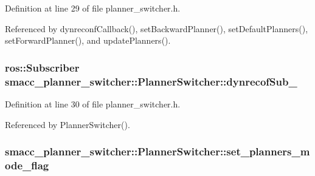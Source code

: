 Definition at line 29 of file planner\+\_\+switcher.\+h.



Referenced by dynreconf\+Callback(), set\+Backward\+Planner(), set\+Default\+Planners(), set\+Forward\+Planner(), and update\+Planners().

\subsubsection[{\texorpdfstring{dynrecof\+Sub\+\_\+}{dynrecofSub_}}]{\setlength{\rightskip}{0pt plus 5cm}ros\+::\+Subscriber smacc\+\_\+planner\+\_\+switcher\+::\+Planner\+Switcher\+::dynrecof\+Sub\+\_\+\hspace{0.3cm}{\ttfamily [private]}}\hypertarget{classsmacc__planner__switcher_1_1PlannerSwitcher_a3ac34789d0fc620bb2bd27f984486ba9}{}\label{classsmacc__planner__switcher_1_1PlannerSwitcher_a3ac34789d0fc620bb2bd27f984486ba9}


Definition at line 30 of file planner\+\_\+switcher.\+h.



Referenced by Planner\+Switcher().

\subsubsection[{\texorpdfstring{set\+\_\+planners\+\_\+mode\+\_\+flag}{set_planners_mode_flag}}]{ smacc\+\_\+planner\+\_\+switcher\+::\+Planner\+Switcher\+::set\+\_\+planners\+\_\+mode\+\_\+flag\hspace{0.3cm}{\ttfamily [private]}}\hypertarget{classsmacc__planner__switcher_1_1PlannerSwitcher_a266b7a17a8c92bda2d74a7c8991a4a61}{}\label{classsmacc__planner__switcher_1_1PlannerSwitcher_a266b7a17a8c92bda2d74a7c8991a4a61}


